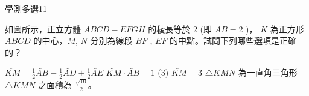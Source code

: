     \begin{QUESTION}
        \begin{ExamInfo}{98}{學測}{多選}{11}
        \end{ExamInfo}
        \begin{ExamAnsRateInfo}{38}{70}{32}{12}
        \end{ExamAnsRateInfo}
        \begin{QBODY}
            如圖所示，正立方體 $ABCD - EFGH$ 的稜長等於 2 (即 $\overline{AB} = 2$ )， $K$ 為正方形 $ABCD $ 的中心，$M$, $N$ 分別為線段 $\overline{BF}$ ,  $\overline{EF}$ 的中點。試問下列哪些選項是正確的？ 
			\begin{QOPS} 
				\QOP  $\lvec{KM} = \frac{1}{2} \lvec{AB} - \frac{1}{2} \lvec{AD} + \frac{1}{2} \lvec{AE}$ 
				\QOP $\lvec{KM} \cdot \lvec{AB}=1$ (3) \quad $\lvec{KM}=3$ 
				\QOP  $\triangle KMN$ 為一直角三角形 
				\QOP $\triangle KMN$ 之面積為 $\frac{\sqrt{10}}{2}$。
			\end{QOPS}
			

\end{QBODY}
\end{QUESTION}

